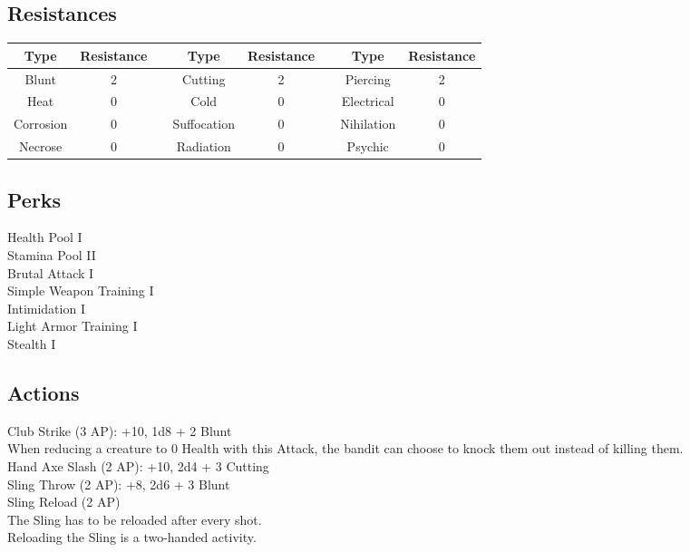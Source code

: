 \subsection{Resistances}
\begin{minipage}[H]{1\textwidth}
	\centering
	\begin{tabular}[c]{|c | c | c | c | c | c | c | c|}
		\hline
		Type & Resistance && Type & Resistance && Type & Resistance\\
		\hline
		Blunt & 2 &&
		Cutting & 2 &&
		Piercing & 2\\
		Heat & 0 &&
		Cold & 0 &&
		Electrical & 0\\
		Corrosion & 0 &&
		Suffocation & 0 &&
		Nihilation & 0 \\
		Necrose & 0 &&
		Radiation & 0 &&
		Psychic & 0\\
		\hline
	\end{tabular}
\end{minipage}

\subsection{Perks}
Health Pool I\\
Stamina Pool II\\
Brutal Attack I\\
Simple Weapon Training I\\
Intimidation I\\
Light Armor Training I\\
Stealth I

\subsection{Actions}
Club Strike (3 AP): +10, 1d8 + 2 Blunt\\
When reducing a creature to 0 Health with this Attack, the bandit can choose to knock them out instead of killing them.\\

Hand Axe Slash (2 AP): +10, 2d4 + 3 Cutting\\

Sling Throw (2 AP): +8, 2d6 + 3 Blunt\\

Sling Reload (2 AP)\\
The Sling has to be reloaded after every shot.\\
Reloading the Sling is a two-handed activity.\\

